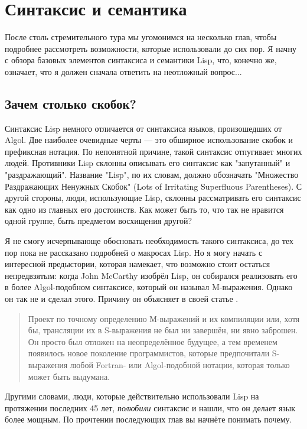 \chapter{Синтаксис и семантика}
\label{ch:04}

После столь стремительного тура мы угомонимся на несколько глав, чтобы подробнее
рассмотреть возможности, которые использовали до сих пор. Я начну с обзора базовых
элементов синтаксиса и семантики Lisp, что, конечно же, означает, что я должен сначала
ответить на неотложный вопрос...

\section{Зачем столько скобок?}

Синтаксис Lisp немного отличается от синтаксиса языков, произошедших от Algol. Две
наиболее очевидные черты --- это обширное использование скобок и префиксная нотация. По
непонятной причине, такой синтаксис отпугивает многих людей. Противники Lisp склонны
описывать его синтаксис как "запутанный" и "раздражающий". Название "Lisp", по их словам,
должно обозначать "Множество Раздражающих Ненужных Скобок" (Lots of Irritating Superfluous
Parentheses). С другой стороны, люди, использующие Lisp, склонны рассматривать его
синтаксис как одно из главных его достоинств. Как может быть то, что так не нравится одной
группе, быть предметом восхищения другой?

Я не смогу исчерпывающе обосновать необходимость такого синтаксиса, до тех пор пока не
рассказано подробней о макросах Lisp. Но я могу начать с интересной предыстории, которая
намекает, что возможно стоит остаться непредвзятым: когда John McCarthy изобрёл Lisp, он
собирался реализовать его в более Algol-подобном синтаксисе, который он называл
M-выражения. Однако он так не и сделал этого. Причину он объясняет в своей статье
.

\begin{quote}
  Проект по точному определению М-выражений и их компиляции или, хотя бы, трансляции их в
  S-выражения не был ни завершён, ни явно заброшен. Он просто был отложен на
  неопределённое будущее, а тем временем появилось новое поколение программистов, которые
  предпочитали S-выражения любой Fortran- или Algol-подобной нотации, которая только может
  быть выдумана.
\end{quote}

Другими словами, люди, которые действительно использовали Lisp на протяжении последних 45
лет, \textit{полюбили} синтаксис и нашли, что он делает язык более мощным. По прочтении
последующих глав вы начнёте понимать почему.

